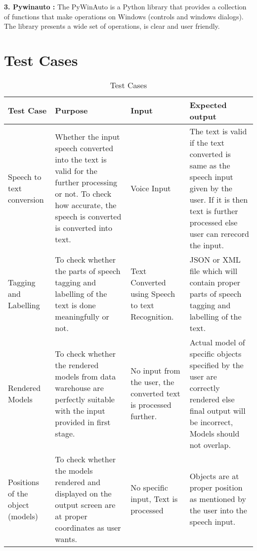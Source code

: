 \textbf{3. Pywinauto : }The PyWinAuto is a Python library that provides a collection of functions that make operations on Windows (controls and windows dialogs). The library presents a wide set of operations, is clear and user friendly.
\newpage
\section{Test Cases}
 \begin{table}[h!]
 \caption{Test Cases}
  \centering

  \begin{tabular}{|p{2.5cm}|p{4.5cm}|p{2cm}|p{4.5cm}|}
\hline
    Test Case&Purpose& Input&Expected output\\
    \hline
   Speech to text conversion&Whether the input speech converted into the text is valid for the further processing or not. To check how accurate, the speech is converted is converted into text.&Voice Input&The text is valid if the text converted is same as the speech input given by the user. If it is then text is further processed else user can rerecord the input.\\
    \hline
   Tagging and Labelling&To check whether the parts of speech tagging and labelling of the text is done meaningfully or not.&Text Converted using Speech to text Recognition.&JSON or XML file which will contain proper parts of speech tagging and labelling of the text.\\
 \hline
  Rendered Models& To check whether the rendered models from data warehouse are perfectly suitable with the input provided in first stage.&No input from the user, the converted text is processed further.&Actual model of specific objects specified by the user are correctly rendered else final output will be incorrect, Models should not overlap.\\
 \hline
   Positions of the object (models)&To check whether the models rendered and displayed on the output screen are at proper coordinates as user wants.&No specific input, Text is processed&Objects are at proper position as mentioned by the user into the speech input.\\

 \hline

  \end{tabular}
\end{table}
